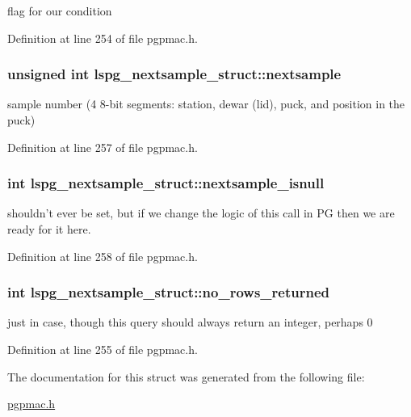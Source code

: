 flag for our condition 



Definition at line 254 of file pgpmac.\-h.

\hypertarget{structlspg__nextsample__struct_aecd82b329462ae06bc2f0d162985a086}{
\subsubsection[{nextsample}]{\setlength{\rightskip}{0pt plus 5cm}unsigned int lspg\-\_\-nextsample\-\_\-struct\-::nextsample}}\label{structlspg__nextsample__struct_aecd82b329462ae06bc2f0d162985a086}


sample number (4 8-\/bit segments\-: station, dewar (lid), puck, and position in the puck) 



Definition at line 257 of file pgpmac.\-h.

\hypertarget{structlspg__nextsample__struct_a2ca6e2a667c9fe7f1a54329de04d2a3c}{
\subsubsection[{nextsample\-\_\-isnull}]{\setlength{\rightskip}{0pt plus 5cm}int lspg\-\_\-nextsample\-\_\-struct\-::nextsample\-\_\-isnull}}\label{structlspg__nextsample__struct_a2ca6e2a667c9fe7f1a54329de04d2a3c}


shouldn't ever be set, but if we change the logic of this call in P\-G then we are ready for it here. 



Definition at line 258 of file pgpmac.\-h.

\hypertarget{structlspg__nextsample__struct_aeee8110133db9f1895237ed9b54dd873}{
\subsubsection[{no\-\_\-rows\-\_\-returned}]{\setlength{\rightskip}{0pt plus 5cm}int lspg\-\_\-nextsample\-\_\-struct\-::no\-\_\-rows\-\_\-returned}}\label{structlspg__nextsample__struct_aeee8110133db9f1895237ed9b54dd873}


just in case, though this query should always return an integer, perhaps 0 



Definition at line 255 of file pgpmac.\-h.



The documentation for this struct was generated from the following file\-:\begin{DoxyCompactItemize}
\item 
\hyperlink{pgpmac_8h}{pgpmac.\-h}\end{DoxyCompactItemize}
